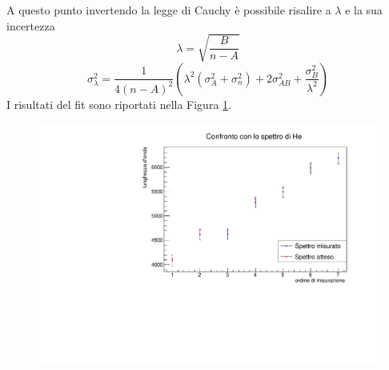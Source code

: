 A questo punto invertendo la legge di Cauchy è possibile risalire a $\lambda$ e la sua incertezza
\begin{equation}
\lambda= \sqrt{\dfrac{B}{n-A}}
\label{lambda}
\end{equation}
\begin{equation}
\sigma_\lambda^2=\frac{1}{4(n-A)^{2}}\left(\lambda^{2}\left(\sigma_{A}^{2}+\sigma_{n}^{2}\right)+2 \sigma_{A B}^{2}+\frac{\sigma_{B}^{2}}{\lambda^{2}}\right)
\label{sigma lambda}
\end{equation}
I risultati del fit sono riportati nella Figura \ref{confronto 1}.
\begin{figure}[h!]
    \centering
    \includegraphics[scale=.6]{Immagini/Confronto 1.pdf}
    \caption{}
    \label{confronto 1}
\end{figure}
